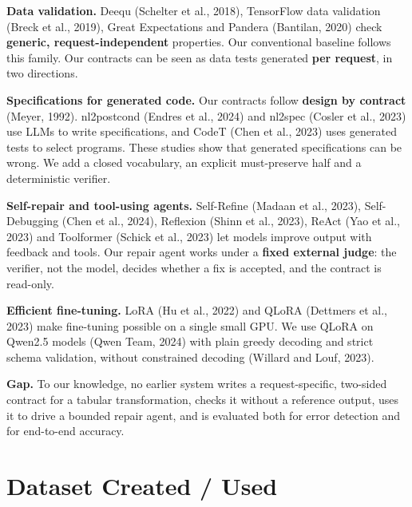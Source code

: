 \documentclass[11pt]{article}
\begin{document}
\textbf{Data validation.} Deequ (Schelter et al., 2018), TensorFlow data
validation (Breck et al., 2019), Great Expectations and Pandera
(Bantilan, 2020) check \textbf{generic, request-independent} properties.
Our conventional baseline follows this family. Our contracts can be seen
as data tests generated \textbf{per request}, in two directions.

\textbf{Specifications for generated code.} Our contracts follow
\textbf{design by contract} (Meyer, 1992). nl2postcond (Endres et al.,
2024) and nl2spec (Cosler et al., 2023) use LLMs to write
specifications, and CodeT (Chen et al., 2023) uses generated tests to
select programs. These studies show that generated specifications can be
wrong. We add a closed vocabulary, an explicit must-preserve half and a
deterministic verifier.

\textbf{Self-repair and tool-using agents.} Self-Refine (Madaan et al.,
2023), Self-Debugging (Chen et al., 2024), Reflexion (Shinn et al.,
2023), ReAct (Yao et al., 2023) and Toolformer (Schick et al., 2023) let
models improve output with feedback and tools. Our repair agent works
under a \textbf{fixed external judge}: the verifier, not the model,
decides whether a fix is accepted, and the contract is read-only.

\textbf{Efficient fine-tuning.} LoRA (Hu et al., 2022) and QLoRA
(Dettmers et al., 2023) make fine-tuning possible on a single small GPU.
We use QLoRA on Qwen2.5 models (Qwen Team, 2024) with plain greedy
decoding and strict schema validation, without constrained decoding
(Willard and Louf, 2023).

\textbf{Gap.} To our knowledge, no earlier system writes a
request-specific, two-sided contract for a tabular transformation,
checks it without a reference output, uses it to drive a bounded repair
agent, and is evaluated both for error detection and for end-to-end
accuracy.

\section{Dataset Created / Used}
\end{document}
